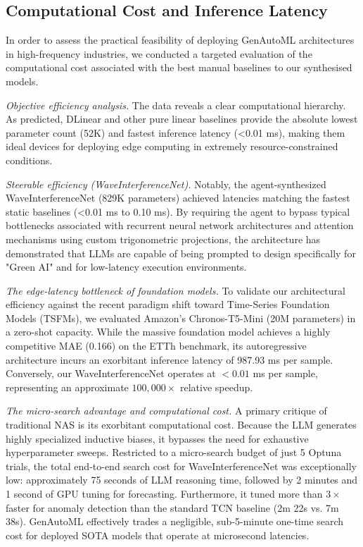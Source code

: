 \documentclass{article}
\begin{document}
 \subsection{Computational Cost and Inference Latency}
In order to assess the practical feasibility of deploying GenAutoML architectures in high-frequency industries, we conducted a targeted evaluation of the computational cost associated with the best manual baselines to our synthesised models.

\textit{Objective efficiency analysis.} The data reveals a clear computational hierarchy. As predicted, DLinear and other pure linear baselines provide the absolute lowest parameter count (52K) and fastest inference latency (<0.01 ms), making them ideal devices for deploying edge computing in extremely resource-constrained conditions.

\textit{Steerable efficiency (WaveInterferenceNet).} Notably, the agent-synthesized WaveInterferenceNet (829K parameters) achieved latencies matching the fastest static baselines (<0.01 ms to 0.10 ms). By requiring the agent to bypass typical bottlenecks associated with recurrent neural network architectures and attention mechanisms using custom trigonometric projections, the architecture has demonstrated that LLMs are capable of being prompted to design specifically for "Green AI" and for low-latency execution environments.

\textit{The edge-latency bottleneck of foundation models.} To validate our architectural efficiency against the recent paradigm shift toward Time-Series Foundation Models (TSFMs), we evaluated Amazon's Chronos-T5-Mini (20M parameters) in a zero-shot capacity. While the massive foundation model achieves a highly competitive MAE (0.166) on the ETTh benchmark, its autoregressive architecture incurs an exorbitant inference latency of 987.93 ms per sample. Conversely, our WaveInterferenceNet operates at $<0.01$ ms per sample, representing an approximate $100,000\times$ relative speedup.

\textit{The micro-search advantage and computational cost.} A primary critique of traditional NAS is its exorbitant computational cost. Because the LLM generates highly specialized inductive biases, it bypasses the need for exhaustive hyperparameter sweeps. Restricted to a micro-search budget of just 5 Optuna trials, the total end-to-end search cost for WaveInterferenceNet was exceptionally low: approximately 75 seconds of LLM reasoning time, followed by 2 minutes and 1 second of GPU tuning for forecasting. Furthermore, it tuned more than $3\times$ faster for anomaly detection than the standard TCN baseline (2m 22s vs. 7m 38s). GenAutoML effectively trades a negligible, sub-5-minute one-time search cost for deployed SOTA models that operate at microsecond latencies.
\end{document}
